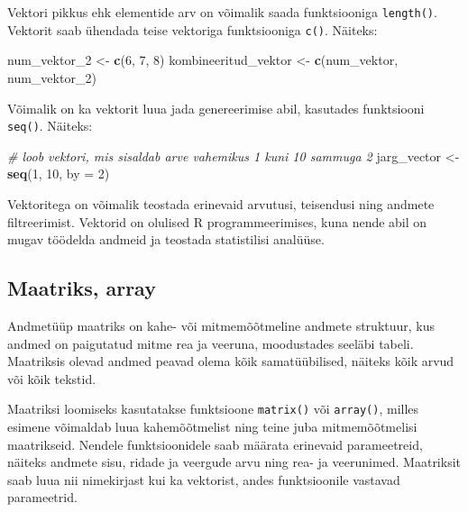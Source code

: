 \documentclass[
]{book}
\newenvironment{Shaded}{\begin{snugshade}}{\end{snugshade}}
\newcommand{\AttributeTok}[1]{\textcolor[rgb]{0.13,0.29,0.53}{#1}}
\newcommand{\CommentTok}[1]{\textcolor[rgb]{0.56,0.35,0.01}{\textit{#1}}}
\newcommand{\DecValTok}[1]{\textcolor[rgb]{0.00,0.00,0.81}{#1}}
\newcommand{\FunctionTok}[1]{\textcolor[rgb]{0.13,0.29,0.53}{\textbf{#1}}}
\newcommand{\NormalTok}[1]{#1}
\newcommand{\OtherTok}[1]{\textcolor[rgb]{0.56,0.35,0.01}{#1}}
\renewenvironment{Shaded} {\begin{snugshade}\footnotesize} {\end{snugshade}}
\begin{document}
Vektori pikkus ehk elementide arv on võimalik saada funktsiooniga \texttt{length()}. Vektorit saab ühendada teise vektoriga funktsiooniga \texttt{c()}. Näiteks:

\begin{Shaded}
\begin{Highlighting}[]
\NormalTok{num\_vektor\_2 }\OtherTok{\textless{}{-}} \FunctionTok{c}\NormalTok{(}\DecValTok{6}\NormalTok{, }\DecValTok{7}\NormalTok{, }\DecValTok{8}\NormalTok{)}
\NormalTok{kombineeritud\_vektor }\OtherTok{\textless{}{-}} \FunctionTok{c}\NormalTok{(num\_vektor, num\_vektor\_2)}
\end{Highlighting}
\end{Shaded}

Võimalik on ka vektorit luua jada genereerimise abil, kasutades funktsiooni \texttt{seq()}. Näiteks:

\begin{Shaded}
\begin{Highlighting}[]
\CommentTok{\# loob vektori, mis sisaldab arve vahemikus 1 kuni 10 sammuga 2}
\NormalTok{jarg\_vector }\OtherTok{\textless{}{-}} \FunctionTok{seq}\NormalTok{(}\DecValTok{1}\NormalTok{, }\DecValTok{10}\NormalTok{, }\AttributeTok{by =} \DecValTok{2}\NormalTok{) }
\end{Highlighting}
\end{Shaded}

Vektoritega on võimalik teostada erinevaid arvutusi, teisendusi ning andmete filtreerimist. Vektorid on olulised R programmeerimises, kuna nende abil on mugav töödelda andmeid ja teostada statistilisi analüüse.

\subsection{Maatriks, array}\label{maatriks-array}

Andmetüüp maatriks on kahe- või mitmemõõtmeline andmete struktuur, kus andmed on paigutatud mitme rea ja veeruna, moodustades seeläbi tabeli. Maatriksis olevad andmed peavad olema kõik samatüübilised, näiteks kõik arvud või kõik tekstid.

Maatriksi loomiseks kasutatakse funktsioone \texttt{matrix()} või \texttt{array()}, milles esimene võimaldab luua kahemõõtmelist ning teine juba mitmemõõtmelisi maatrikseid. Nendele funktsioonidele saab määrata erinevaid parameetreid, näiteks andmete sisu, ridade ja veergude arvu ning rea- ja veerunimed. Maatriksit saab luua nii nimekirjast kui ka vektorist, andes funktsioonile vastavad parameetrid.
\end{document}
